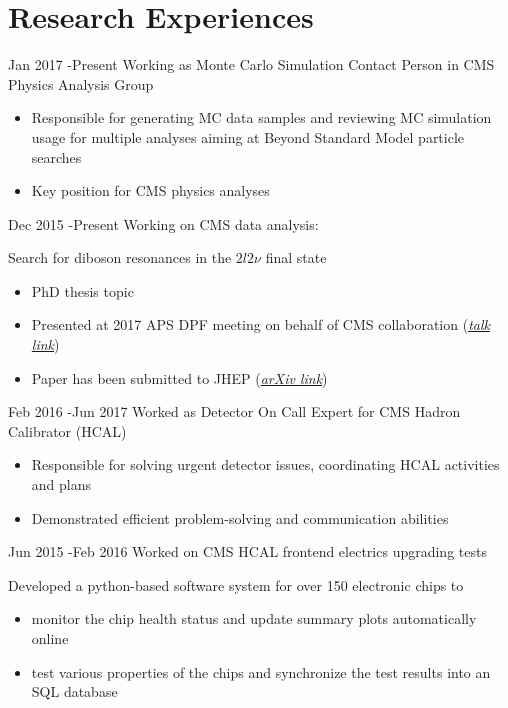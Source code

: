 \documentclass[10pt]{article} %
\begin{document}
\section{Research Experiences}
\job
{Jan 2017 -}{Present}
{Working as Monte Carlo Simulation Contact Person in CMS Physics Analysis Group}
{
\begin{itemize}
\item Responsible for generating MC data samples and reviewing MC simulation usage for multiple analyses aiming at Beyond Standard Model particle searches
\item Key position for CMS physics analyses
\end{itemize}}
\job
{Dec 2015 -}{Present}
{Working on CMS data analysis:}
{Search for diboson resonances in the $2l2\nu$ final state
\begin{itemize}
\item PhD thesis topic
\item Presented at 2017 APS DPF meeting on behalf of CMS collaboration (\href{https://indico.fnal.gov/event/11999/session/10/contribution/56}{\textit{talk link}})
\item Paper has been submitted to JHEP (\href{https://arxiv.org/abs/1711.04370}{\textit{arXiv link}})
\end{itemize}}
\job
{Feb 2016 -}{Jun 2017}
{Worked as Detector On Call Expert for CMS Hadron Calibrator (HCAL)}
{
\begin{itemize}
\item Responsible for solving urgent detector issues, coordinating HCAL activities and plans
\item Demonstrated efficient problem-solving and communication abilities
\end{itemize}}
\job
{Jun 2015 -}{Feb 2016}
{Worked on CMS HCAL frontend electrics upgrading tests}
{Developed a python-based software system for over 150 electronic chips to
\begin{itemize}
\item monitor the chip health status and update summary plots automatically online
\item test various properties of the chips and synchronize the test results into an SQL database
\end{itemize}
}
\end{document}
